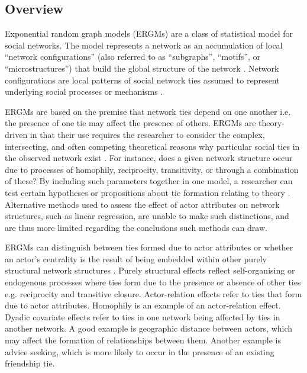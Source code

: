 \subsection{Overview}

Exponential random graph models (ERGMs) are a class of statistical model for social networks. The model represents a network as an accumulation of local \enquote{network configurations} (also referred to as \enquote{subgraphs}, \enquote{motifs}, or \enquote{microstructures}) that build the global structure of the network \citep{robins2013tutorial}. Network configurations are local patterns of social network ties assumed to represent underlying social processes or mechanisms \citep{lusher2013exponential}. \medskip

ERGMs are based on the premise that network ties depend on one another i.e. the presence of one tie may affect the presence of others. ERGMs are theory-driven in that their use requires the researcher to consider the complex, intersecting, and often competing theoretical reasons why particular social ties in the observed network exist \citep{lusher2013exponential}. For instance, does a given network structure occur due to processes of homophily, reciprocity, transitivity, or through a combination of these? By including such parameters together in one model, a researcher can test certain hypotheses or propositions about tie formation relating to theory \citep{robins2007recent}. Alternative methods used to assess the effect of actor attributes on network structures, such as linear regression, are unable to make such distinctions, and are thus more limited regarding the conclusions such methods can draw. \medskip

ERGMs can distinguish between ties formed due to actor attributes or whether an actor’s centrality is the result of being embedded within other purely structural network structures \citep{lusher2013exponential}. Purely structural effects reflect self-organising or endogenous processes where ties form due to the presence or absence of other ties e.g. reciprocity and transitive closure. Actor-relation effects refer to ties that form due to actor attributes. Homophily is an example of an actor-relation effect.  Dyadic covariate effects refer to ties in one network being affected by ties in another network. A good example is geographic distance between actors, which may affect the formation of relationships between them. Another example is advice seeking, which is more likely to occur in the presence of an existing friendship tie. \medskip

